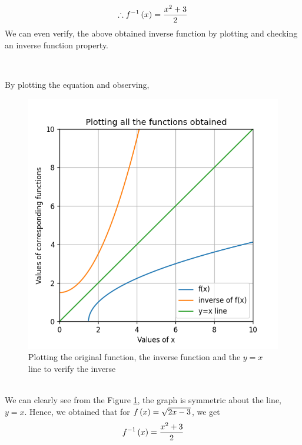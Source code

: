 \documentclass[journal,12pt,twocolumn]{IEEEtran}
\begin{document}
\begin{itemize}
\begin{align}
	\end{align}
	\begin{align}
	\therefore f^{-1}\left(x\right) = \frac{x^{2} + 3}{2}
	\end{align}
	We can even verify, the above obtained inverse function by plotting and checking an inverse function property.
	\begin{center}
\\
\end{center}
	By plotting the equation and observing,
	\begin{figure}[h!]
		\centering
		\includegraphics[width=\columnwidth]{Fig_2}
		\caption{Plotting the original function, the inverse function and the $y=x$ line to verify the inverse}
		 \label{fig:2}
	\end{figure}\\
	We can clearly see from the Figure \ref{fig:2}, the graph is symmetric about the line, $y = x$. Hence, we obtained that for $f\left(x\right)=\sqrt{2x-3}$, we get
	\begin{align} \label{eq:1.1}
	f^{-1}\brak{x} = \frac{x^{2} + 3}{2}

\end{align}
\end{itemize}
\end{document}
